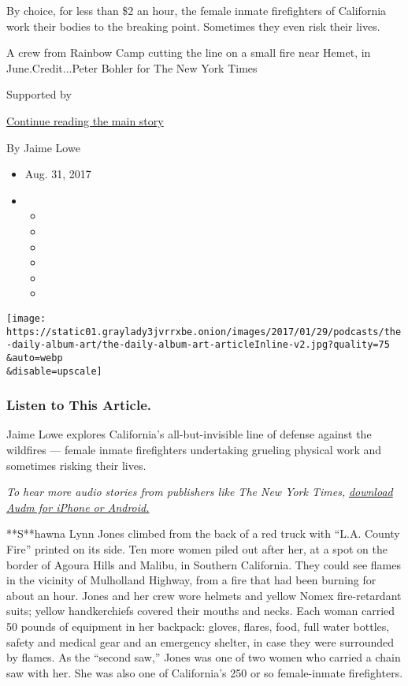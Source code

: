 By choice, for less than \$2 an hour, the female inmate firefighters of
California work their bodies to the breaking point. Sometimes they even
risk their lives.

A crew from Rainbow Camp cutting the line on a small fire near Hemet, in
June.Credit...Peter Bohler for The New York Times

Supported by

\protect\hyperlink{after-sponsor}{Continue reading the main story}

By Jaime Lowe

\begin{itemize}
\item
  Aug. 31, 2017
\item
  \begin{itemize}
  \item
  \item
  \item
  \item
  \item
  \item
  \end{itemize}
\end{itemize}

\texttt{[image: https://static01.graylady3jvrrxbe.onion/images/2017/01/29/podcasts/the-daily-album-art/the-daily-album-art-articleInline-v2.jpg?quality=75\\\&auto=webp\\\&disable=upscale]}

\hypertarget{listen-to-this-article}{%
\subsubsection{Listen to This Article.}\label{listen-to-this-article}}

Jaime Lowe explores California's all-but-invisible line of defense
against the wildfires --- female inmate firefighters undertaking
grueling physical work and sometimes risking their lives.

\emph{To hear more audio stories from publishers like The New York
Times,}
\href{https://www.audm.com/?utm_source=nytmag\&utm_medium=embed\&utm_campaign=incarcerated_women_california}{\emph{download
Audm for iPhone or Android.}}

**S**hawna Lynn Jones climbed from the back of a red truck with ``L.A.
County Fire'' printed on its side. Ten more women piled out after her,
at a spot on the border of Agoura Hills and Malibu, in Southern
California. They could see flames in the vicinity of Mulholland Highway,
from a fire that had been burning for about an hour. Jones and her crew
wore helmets and yellow Nomex fire-retardant suits; yellow handkerchiefs
covered their mouths and necks. Each woman carried 50 pounds of
equipment in her backpack: gloves, flares, food, full water bottles,
safety and medical gear and an emergency shelter, in case they were
surrounded by flames. As the ``second saw,'' Jones was one of two women
who carried a chain saw with her. She was also one of California's 250
or so female-inmate firefighters.

